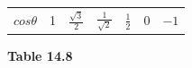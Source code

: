 {{\begin{center}
\begin{tabular}[t]{|l|l|l|l|l|l|l|}
                  $cos\theta $
                 &
        1 &
                  $\frac{\sqrt{3}}{2}$
                 &
                  $\frac{1}{\sqrt{2}}$
                 &
                  $\frac{1}{2}$
                 &
        0 &
                  $-1$
     \tabularnewline\cline{1-1}\cline{2-2}\cline{3-3}\cline{4-4}\cline{5-5}\cline{6-6}\cline{7-7}
    \end{tabular}
      \end{center}
    \begin{center}{\small\bfseries Table 14.8}\end{center}
          }{ %
        \begin{center}
      \label{m39414*id86909}
    \noindent
      \tablelasttail{}
      \begin{xtabular}[t]{|l|l|l|l|l|l|l|}\hline

\end{xtabular}
\end{center}}}
